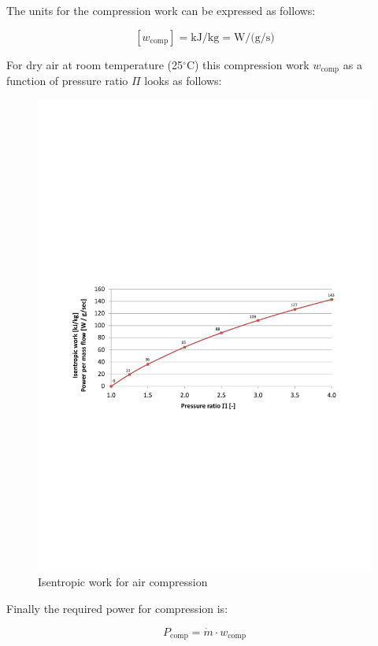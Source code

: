 \documentclass[11pt,a4paper,english,twoside]{scrreprt}
\newcommand{\gradC}{${}^\circ$C}      %
\begin{document}
The units for the compression work can be expressed as follows:

\[
[w_\text{comp}] = \si{\kilo\joule\per\kilo\gram} = \si{\watt\per(\gram\per\second)}
\]

For dry air at room temperature (25\gradC) this compression work $w_\text{comp}$ as a function of pressure ratio $\Pi$ looks as follows:

\begin{figure}
  \centering
  \includegraphics*[width=\textwidth,angle=0]{FCF_Chart_IsenWork.pdf}
  \caption[Isentropic work for air compression]{Isentropic work for air compression}
  \label{fig:IsenWork}
\end{figure}


Finally the required power for compression is:

\[P_\text{comp} = \dot{m} \cdot w_\text{comp}\]
\end{document}
